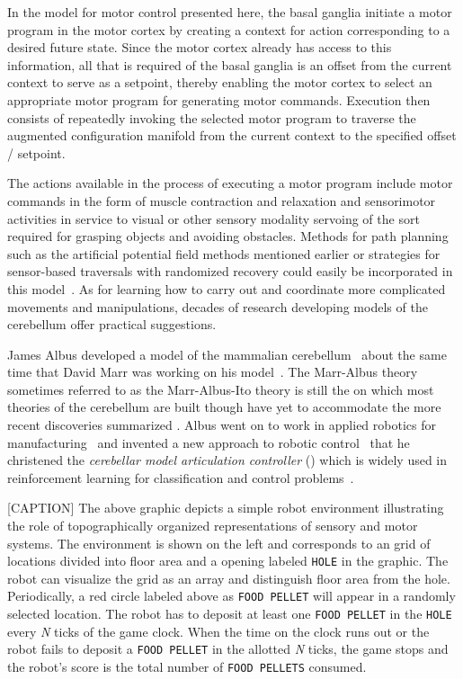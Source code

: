 In the model for motor control presented here, the basal ganglia initiate a motor program in the motor cortex by creating a context for action corresponding to a desired future state. Since the motor cortex already has access to this information, all that is required of the basal ganglia is an offset from the current context to serve as a setpoint, thereby enabling the motor cortex to select an appropriate motor program for generating motor commands. Execution then consists of repeatedly invoking the selected motor program to traverse the augmented configuration manifold from the current context to the specified offset / setpoint.

The actions available in the process of executing a motor program include motor commands in the form of muscle contraction and relaxation and sensorimotor activities in service to visual {\emdash{}} or other sensory modality {\emdash{}} servoing of the sort required for grasping objects and avoiding obstacles. Methods for path planning such as the artificial potential field methods mentioned earlier or strategies for sensor-based traversals with randomized recovery could easily be incorporated in this model~\cite{LiarokapisetalICAR-15}. As for learning how to carry out and coordinate more complicated movements and manipulations, decades of research developing models of the cerebellum offer practical suggestions.

James Albus developed a model of the mammalian cerebellum~\cite{AlbusMB-71} about the same time that David Marr was working on his model~\cite{MarrJoP-69}. The Marr-Albus theory {\emdash{}} sometimes referred to as the Marr-Albus-Ito theory {\emdash{}} is still the {} on which most theories of the cerebellum are built {\emdash{}} though have yet to accommodate the more recent discoveries summarized {}. Albus went on to work in applied robotics for manufacturing~\cite{AlbusetalSME-84} and invented a new approach to robotic control~\cite{Albus75} that he christened the {\it{cerebellar model articulation controller}} ({}) which is widely used in reinforcement learning for classification and control problems~\cite{ShewchukPhD}.

[CAPTION] The above graphic depicts a simple robot environment illustrating the role of topographically organized representations of sensory and motor systems. The environment is shown on the left and corresponds to an {} grid of locations divided into floor area and a {} opening labeled {\tt{HOLE}} in the graphic. The robot can visualize the grid as an {} array and distinguish floor area from the hole. Periodically, a red circle labeled above as {\tt{FOOD PELLET}} will appear in a randomly selected location. The robot has to deposit at least one {\tt{FOOD PELLET}} in the {\tt{HOLE}} every {\it{N}} ticks of the game clock. When the time on the clock runs out or the robot fails to deposit a {\tt{FOOD PELLET}} in the allotted {\it{N}} ticks, the game stops and the robot's score is the total number of {\tt{FOOD PELLETS}} consumed.

